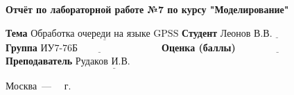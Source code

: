 \begin{titlepage}
	
	\begin{center}
		\Large\textbf{Отчёт по лабораторной работе №7 \newline по курсу "Моделирование"}\newline
	\end{center}
	
	\noindent\textbf{Тема} $\underline{\text{Обработка очереди на языке GPSS}}$\newline\newline\newline
	\noindent\textbf{Студент} $\underline{\text{Леонов В.В.~~~~~~~~~~~~~~~~~~~}}$\newline\newline
	\noindent\textbf{Группа} $\underline{\text{ИУ7-76Б~~~~~~~~~~~~~~~~~~~~~~~~~}}$\newline\newline
	\noindent\textbf{Оценка (баллы)} $\underline{\text{~~~~~~~~~~~~~~~~~~~~~~~~}}$\newline\newline
	\noindent\textbf{Преподаватель} $\underline{\text{Рудаков И.В. ~~~~~~}}$\newline
	
	\begin{center}
		\vfill
		Москва~---~\the\year
		~г.
	\end{center}
 \restoregeometry
\end{titlepage}
